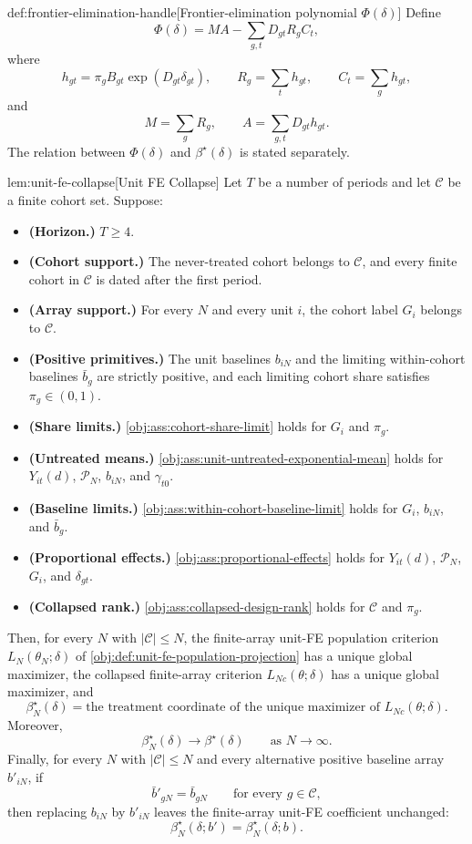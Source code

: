 \begin{definitionv}{def:frontier-elimination-handle}[Frontier-elimination polynomial $\Phi(\delta)$]
Define
\[
\Phi(\delta)
=
M A
-
\sum_{g,t} D_{gt} R_g C_t,
\]
where
\[
h_{gt}
=
\pi_g B_{gt}\exp(D_{gt}\delta_{gt}),\qquad
R_g=\sum_t h_{gt},\qquad
C_t=\sum_g h_{gt},
\]
and
\[
M=\sum_g R_g,\qquad
A=\sum_{g,t}D_{gt}h_{gt}.
\]
The relation between $\Phi(\delta)$ and $\beta^\star(\delta)$ is stated separately.
\end{definitionv}

\begin{propositionv}{lem:unit-fe-collapse}[Unit FE Collapse]
Let $T$ be a number of periods and let $\mathcal C$ be a finite cohort set. Suppose:
\begin{itemize}
\item \textbf{(Horizon.)} $T\ge 4$.
\item \textbf{(Cohort support.)} The never-treated cohort belongs to $\mathcal C$, and every finite cohort in $\mathcal C$ is dated after the first period.
\item \textbf{(Array support.)} For every $N$ and every unit $i$, the cohort label $G_i$ belongs to $\mathcal C$.
\item \textbf{(Positive primitives.)} The unit baselines $b_{iN}$ and the limiting within-cohort baselines $\bar b_g$ are strictly positive, and each limiting cohort share satisfies $\pi_g\in(0,1)$.
\item \textbf{(Share limits.)} \cref{obj:ass:cohort-share-limit} holds for $G_i$ and $\pi_g$.
\item \textbf{(Untreated means.)} \cref{obj:ass:unit-untreated-exponential-mean} holds for $Y_{it}(d)$, $\mathcal P_N$, $b_{iN}$, and $\gamma_{t0}$.
\item \textbf{(Baseline limits.)} \cref{obj:ass:within-cohort-baseline-limit} holds for $G_i$, $b_{iN}$, and $\bar b_g$.
\item \textbf{(Proportional effects.)} \cref{obj:ass:proportional-effects} holds for $Y_{it}(d)$, $\mathcal P_N$, $G_i$, and $\delta_{gt}$.
\item \textbf{(Collapsed rank.)} \cref{obj:ass:collapsed-design-rank} holds for $\mathcal C$ and $\pi_g$.
\end{itemize}
Then, for every $N$ with $|\mathcal C|\le N$, the finite-array unit-FE population criterion $L_N(\theta_N;\delta)$ of \cref{obj:def:unit-fe-population-projection} has a unique global maximizer, the collapsed finite-array criterion $L_{Nc}(\theta;\delta)$ has a unique global maximizer, and
\[
\beta_N^\star(\delta)
=
\text{the treatment coordinate of the unique maximizer of }L_{Nc}(\theta;\delta).
\]
Moreover,
\[
\beta_N^\star(\delta)\longrightarrow \beta^\star(\delta)
\qquad\text{as }N\to\infty .
\]
Finally, for every $N$ with $|\mathcal C|\le N$ and every alternative positive baseline array $b'_{iN}$, if
\[
\bar b'_{gN}=\bar b_{gN}
\qquad\text{for every }g\in\mathcal C,
\]
then replacing $b_{iN}$ by $b'_{iN}$ leaves the finite-array unit-FE coefficient unchanged:
\[
\beta_N^\star(\delta;b')=\beta_N^\star(\delta;b).
\]
\end{propositionv}

